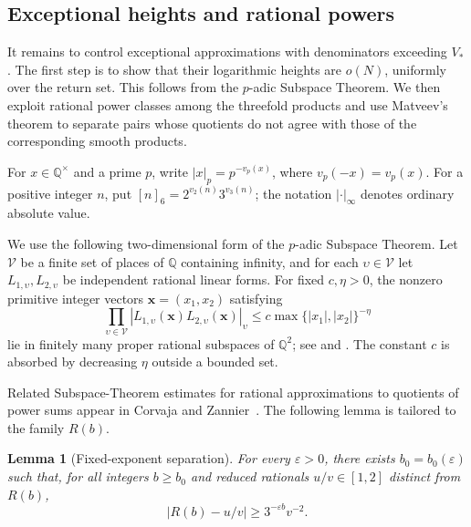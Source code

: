 \documentclass[11pt,reqno]{amsart}
\theoremstyle{definition}
\newcommand{\Q}{\mathbb Q}
\theoremstyle{plain}
\newtheorem{lemma}{Lemma}[section]
\theoremstyle{definition}
\theoremstyle{remark}
\begin{document}
\subsection{Exceptional heights and rational powers}
\label{sec:subspace}

It remains to control exceptional approximations with denominators
exceeding $V_*$. The first step is to show that their logarithmic
heights are $o(N)$, uniformly over the return set. This follows
from the $p$-adic Subspace Theorem. We then exploit rational
power classes among the threefold products and use Matveev's
theorem to separate pairs whose quotients do not agree with
those of the corresponding smooth products.

For $x\in\Q^\times$ and a prime $p$, write
$|x|_p=p^{-v_p(x)}$, where $v_p(-x)=v_p(x)$.
For a positive integer $n$, put
$[n]_6=2^{v_2(n)}3^{v_3(n)}$; the notation
$|\cdot|_\infty$ denotes ordinary absolute value.

We use the following two-dimensional form of the $p$-adic
Subspace Theorem. Let $\mathcal V$ be a finite set of places
of $\Q$ containing infinity, and for each
$\upsilon\in\mathcal V$ let
$L_{1,\upsilon},L_{2,\upsilon}$ be independent rational
linear forms. For fixed $c,\eta>0$, the nonzero primitive
integer vectors $\mathbf x=(x_1,x_2)$ satisfying
\begin{equation}\label{eq:subspace}
 \prod_{\upsilon\in\mathcal V}
 |L_{1,\upsilon}(\mathbf x)
 L_{2,\upsilon}(\mathbf x)|_\upsilon
 \le c\max\{|x_1|,|x_2|\}^{-\eta}
\end{equation}
lie in finitely many proper rational subspaces of $\Q^2$;
see \cite[p.~246, (1.3)--(1.5)]{Schlickewei} and
\cite[Corollary~7.2.5]{BG}. The constant $c$ is absorbed
by decreasing $\eta$ outside a bounded set.

Related Subspace-Theorem estimates for rational
approximations to quotients of power sums appear in
Corvaja and Zannier~\cite{CorvajaZannier}.
The following lemma is tailored to the family $R(b)$.

\begin{lemma}[Fixed-exponent separation]
\label{lem:fixed-separation}
For every $\varepsilon>0$, there exists
$b_0=b_0(\varepsilon)$ such that, for all integers
$b\ge b_0$ and reduced rationals $u/v\in[1,2]$
distinct from $R(b)$,
\begin{equation}\label{eq:fixed-separation}
 |R(b)-u/v|\ge3^{-\varepsilon b}v^{-2}.
\end{equation}
\end{lemma}
\end{document}
